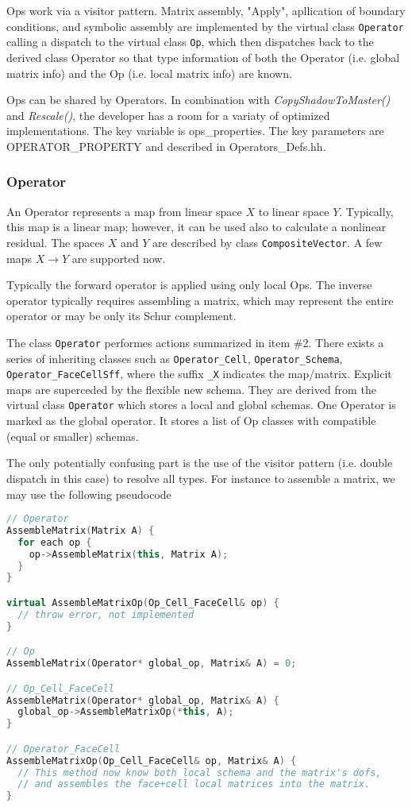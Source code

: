 Ops work via a visitor pattern.
Matrix assembly, "Apply", apllication of boundary conditions, and symbolic assembly 
are implemented by the virtual class {\tt Operator} calling a dispatch to the 
virtual class {\tt Op}, which then dispatches back to the derived class Operator so that
type information of both the Operator (i.e. global matrix info) and 
the Op (i.e. local matrix info) are known.

Ops can be shared by Operators. 
In combination with {\it CopyShadowToMaster()} and {\it Rescale()},
the developer has a room for a variaty of optimized implementations.
The key variable is ops\_properties. The key parameters are 
OPERATOR\_PROPERTY and described in Operators\_Defs.hh.


\subsubsection{Operator}
An Operator represents a map from linear space $X$ to linear space $Y$.
Typically, this map is a linear map; however, it can be used also to calculate
a nonlinear residual. 
The spaces $X$ and $Y$ are described by class {\tt CompositeVector}. 
A few maps $X \to Y$ are supported now.

Typically the forward operator is applied using only local Ops.
The inverse operator typically requires assembling a matrix, which 
may represent the entire operator or may be only its Schur complement.

The class {\tt Operator} performes actions summarized in item \#2. There exists
a series of inheriting classes such as {\tt Operator\_Cell}, {\tt Operator\_Schema}, 
{\tt Operator\_FaceCellSff}, where the suffix {\tt \_X} indicates the map/matrix.
Explicit maps are superceded by the flexible new schema.
They are derived from the virtual class {\tt Operator} which stores a local 
and global schemas. 
One Operator is marked as the global operator. It stores a list of Op classes
with compatible (equal or smaller) schemas.

The only potentially confusing part is the use of the visitor pattern (i.e. double 
dispatch in this case) to resolve all types.  
For instance to assemble a matrix, we may use the following pseudocode

\begin{lstlisting}[language=C++]
// Operator
AssembleMatrix(Matrix A) {
  for each op {
    op->AssembleMatrix(this, Matrix A);
  }
}

virtual AssembleMatrixOp(Op_Cell_FaceCell& op) { 
  // throw error, not implemented
}

// Op
AssembleMatrix(Operator* global_op, Matrix& A) = 0;

// Op_Cell_FaceCell
AssembleMatrix(Operator* global_op, Matrix& A) {
  global_op->AssembleMatrixOp(*this, A);
}

// Operator_FaceCell
AssembleMatrixOp(Op_Cell_FaceCell& op, Matrix& A) {
  // This method now know both local schema and the matrix's dofs, 
  // and assembles the face+cell local matrices into the matrix.
}
\end{lstlisting}

